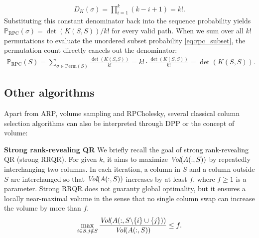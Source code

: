 \documentclass[11pt]{article}
\newcommand{\be}{\begin{eqnarray}}
\newcommand{\ee}{\end{eqnarray}}
\newcommand{\<}{\langle}
\renewcommand{\>}{\rangle}
\begin{document}
\be
D_K(\sigma) = \prod_{i=1}^k (k - i + 1) = k!.
\ee
Substituting this constant denominator back into the sequence probability yields $\mathbb{P}_{\text{RPC}}(\sigma) = \det(K(S,S))/k!$ for every valid path. When we sum over all $k!$ permutations to evaluate the unordered subset probability \eqref{eq:rpc_subset}, the permutation count directly cancels out the denominator:
\be
\mathbb{P}_{\text{RPC}}(S) = \sum_{\sigma \in \text{Perm}(S)} \frac{\det(K(S,S))}{k!} = k! \cdot \frac{\det(K(S,S))}{k!} = \det(K(S,S)).
\ee

\subsection{Other algorithms}
Apart from ARP, volume sampling and RPCholesky, several
classical column selection algorithms can also be interpreted through DPP or the concept of volume:

\textbf{Strong rank-revealing QR}
We briefly recall the goal of strong rank-revealing QR\cite{srrqr} (strong RRQR). For given $k$, it aims to maximize $\emph{Vol}(A(:,S))$ by repeatedly interchanging two columns. In each iteration, a column in $S$ and a column outside $S$ are interchanged so that $\emph{Vol}(A(:,S))$ increases by at least $f$, where $f \geq 1$ is a parameter. Strong RRQR does not guaranty global optimality, but it ensures a locally near-maximal volume in the sense that no single column swap can increase the volume by more than 
$f$.
    \be
    \max\limits_{i\in S,j\notin S} \frac{\emph{Vol}(A(:,S\backslash\{i\}\cup \{j\}))}{\emph{Vol}(A(:,S))} \leq f.
    \ee
\end{document}
